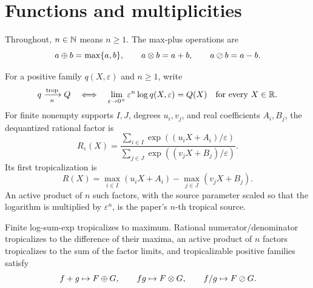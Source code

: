 
\begin{abstract}
Definitions, statements, and proofs follow the source paper in order.
Each formalized item links to its verified Lean declaration; the compact
formalization map beneath it identifies the implementation file.
\end{abstract}

\setcounter{section}{1}
\section{Functions and multiplicities}

Throughout, $n\in\mathbb N$ means $n\geq1$.  The max-plus operations are
\[
  a\mathbin{\oplus} b=\max\{a,b\},\qquad
  a\mathbin{\otimes} b=a+b,\qquad
  a\mathbin{\oslash} b=a-b.
\]
\begin{definition}[Tropicalization]
\leanok
For a positive family $q(X,\varepsilon)$ and $n\geq1$, write
\[
 q\xrightarrow[n]{\mathrm{trop}}Q
 \quad\Longleftrightarrow\quad
 \lim_{\varepsilon\to0^+}\varepsilon^n\log q(X,\varepsilon)=Q(X)
 \quad\text{for every }X\in\mathbb R.
\]
For finite nonempty supports $I,J$, degrees $u_i,v_j$, and real
coefficients $A_i,B_j$, the dequantized rational factor is
\[
 R_\varepsilon(X)=
 \frac{\sum_{i\in I}\exp((u_iX+A_i)/\varepsilon)}
      {\sum_{j\in J}\exp((v_jX+B_j)/\varepsilon)}.
\]
Its first tropicalization is
\[
 R(X)=\max_{i\in I}(u_iX+A_i)-\max_{j\in J}(v_jX+B_j).
\]
An active product of $n$ such factors, with the source parameter scaled so
that the logarithm is multiplied by $\varepsilon^n$, is the paper's
$n$-th tropical source.
\end{definition}

\begin{proposition}
\leanok
{}
Finite log-sum-exp tropicalizes to maximum.  Rational numerator/denominator
tropicalizes to the difference of their maxima, an active product of $n$
factors tropicalizes to the sum of the factor limits, and tropicalizable
positive families satisfy
\[
 f+g\mapsto F\mathbin{\oplus} G,\qquad fg\mapsto F\mathbin{\otimes} G,
 \qquad f/g\mapsto F\mathbin{\oslash} G.
\]
\end{proposition}

